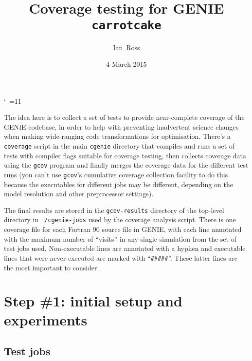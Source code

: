 \documentclass[a4paper,10pt,article]{memoir}
\title{Coverage testing for GENIE \texttt{carrotcake}}
\author{Ian~Ross}
\date{4 March 2015}
\begin{document}
\catcode`~=11    %

\maketitle

The idea here is to collect a set of tests to provide near-complete
coverage of the GENIE codebase, in order to help with preventing
inadvertent science changes when making wide-ranging code
transformations for optimisation.  There's a \texttt{coverage} script
in the main \texttt{cgenie} directory that compiles and runs a set of
tests with compiler flags suitable for coverage testing, then collects
coverage data using the \texttt{gcov} program and finally merges the
coverage data for the different test runs (you can't use
\texttt{gcov}'s cumulative coverage collection facility to do this
because the executables for different jobs may be different, depending
on the model resolution and other preprocessor settings).

The final results are stored in the \texttt{gcov-results} directory of
the top-level directory in \texttt{~/cgenie-jobs} used by the coverage
analysis script.  There is one coverage file for each Fortran 90
source file in GENIE, with each line annotated with the maximum number
of ``visits'' in any single simulation from the set of test jobs used.
Non-executable lines are annotated with a hyphen and executable lines
that were never executed are marked with ``\texttt{\#\#\#\#\#}''.
These latter lines are the most important to consider.

\chapter{Step \#1: initial setup and experiments}

\section{Test jobs}
\end{document}
